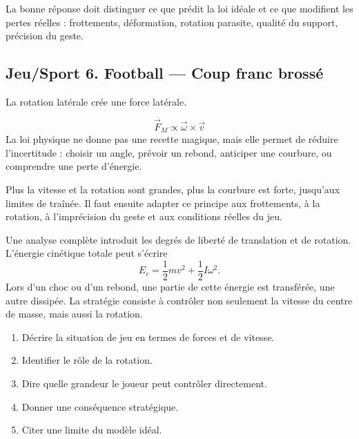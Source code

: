 \documentclass[11pt,a4paper]{article}
\begin{document}
\begin{corrigebox}[Indication]
La bonne réponse doit distinguer ce que prédit la loi idéale et ce que modifient les pertes réelles : frottements, déformation, rotation parasite, qualité du support, précision du geste.
\end{corrigebox}


\subsection{Jeu/Sport 6. Football — Coup franc brossé}

\begin{exemplebox}[Observation]
La rotation latérale crée une force latérale.
\end{exemplebox}

\begin{theorembox}
\[
\vec F_M\propto \vec\omega\times\vec v
\]
La loi physique ne donne pas une recette magique, mais elle permet de réduire l'incertitude : choisir un angle, prévoir un rebond, anticiper une courbure, ou comprendre une perte d'énergie.
\end{theorembox}

\begin{methodebox}
Plus la vitesse et la rotation sont grandes, plus la courbure est forte, jusqu'aux limites de traînée.
Il faut ensuite adapter ce principe aux frottements, à la rotation, à l'imprécision du geste et aux conditions réelles du jeu.
\end{methodebox}

\begin{approfondissementbox}
Une analyse complète introduit les degrés de liberté de translation et de rotation. L'énergie cinétique totale peut s'écrire
\[
E_c=\frac12mv^2+\frac12I\omega^2.
\]
Lors d'un choc ou d'un rebond, une partie de cette énergie est transférée, une autre dissipée. La stratégie consiste à contrôler non seulement la vitesse du centre de masse, mais aussi la rotation.
\end{approfondissementbox}

\begin{exercicebox}
\begin{enumerate}
  \item Décrire la situation de jeu en termes de forces et de vitesse.
  \item Identifier le rôle de la rotation.
  \item Dire quelle grandeur le joueur peut contrôler directement.
  \item Donner une conséquence stratégique.
  \item Citer une limite du modèle idéal.
\end{enumerate}
\end{exercicebox}
\end{document}
